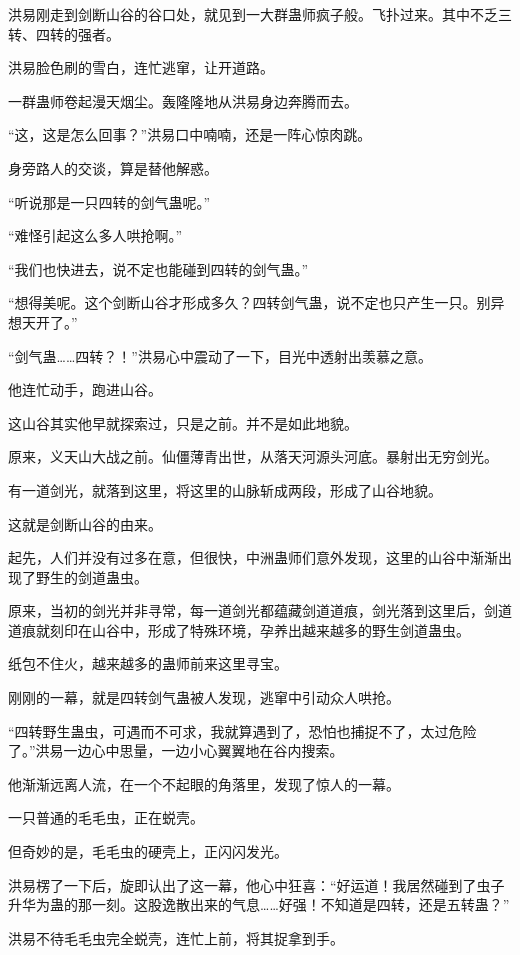 \begin{this_body}
洪易刚走到剑断山谷的谷口处，就见到一大群蛊师疯子般。飞扑过来。其中不乏三转、四转的强者。

洪易脸色刷的雪白，连忙逃窜，让开道路。

一群蛊师卷起漫天烟尘。轰隆隆地从洪易身边奔腾而去。

“这，这是怎么回事？”洪易口中喃喃，还是一阵心惊肉跳。

身旁路人的交谈，算是替他解惑。

“听说那是一只四转的剑气蛊呢。”

“难怪引起这么多人哄抢啊。”

“我们也快进去，说不定也能碰到四转的剑气蛊。”

“想得美呢。这个剑断山谷才形成多久？四转剑气蛊，说不定也只产生一只。别异想天开了。”

“剑气蛊……四转？！”洪易心中震动了一下，目光中透射出羡慕之意。

他连忙动手，跑进山谷。

这山谷其实他早就探索过，只是之前。并不是如此地貌。

原来，义天山大战之前。仙僵薄青出世，从落天河源头河底。暴射出无穷剑光。

有一道剑光，就落到这里，将这里的山脉斩成两段，形成了山谷地貌。

这就是剑断山谷的由来。

起先，人们并没有过多在意，但很快，中洲蛊师们意外发现，这里的山谷中渐渐出现了野生的剑道蛊虫。

原来，当初的剑光并非寻常，每一道剑光都蕴藏剑道道痕，剑光落到这里后，剑道道痕就刻印在山谷中，形成了特殊环境，孕养出越来越多的野生剑道蛊虫。

纸包不住火，越来越多的蛊师前来这里寻宝。

刚刚的一幕，就是四转剑气蛊被人发现，逃窜中引动众人哄抢。

“四转野生蛊虫，可遇而不可求，我就算遇到了，恐怕也捕捉不了，太过危险了。”洪易一边心中思量，一边小心翼翼地在谷内搜索。

他渐渐远离人流，在一个不起眼的角落里，发现了惊人的一幕。

一只普通的毛毛虫，正在蜕壳。

但奇妙的是，毛毛虫的硬壳上，正闪闪发光。

洪易楞了一下后，旋即认出了这一幕，他心中狂喜：“好运道！我居然碰到了虫子升华为蛊的那一刻。这股逸散出来的气息……好强！不知道是四转，还是五转蛊？”

洪易不待毛毛虫完全蜕壳，连忙上前，将其捉拿到手。


\end{this_body}
